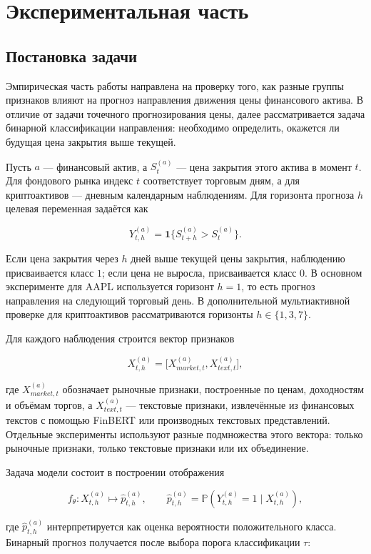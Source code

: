 \section{Экспериментальная часть}

\subsection{Постановка задачи}

Эмпирическая часть работы направлена на проверку того, как разные группы признаков влияют на прогноз направления движения цены финансового актива. В отличие от задачи точечного прогнозирования цены, далее рассматривается задача бинарной классификации направления: необходимо определить, окажется ли будущая цена закрытия выше текущей.

Пусть $a$ --- финансовый актив, а $S_t^{(a)}$ --- цена закрытия этого актива в момент $t$. Для фондового рынка индекс $t$ соответствует торговым дням, а для криптоактивов --- дневным календарным наблюдениям. Для горизонта прогноза $h$ целевая переменная задаётся как

\[
Y_{t,h}^{(a)} = \mathbf{1}\{S_{t+h}^{(a)} > S_t^{(a)}\}.
\]

Если цена закрытия через $h$ дней выше текущей цены закрытия, наблюдению присваивается класс $1$; если цена не выросла, присваивается класс $0$. В основном эксперименте для AAPL используется горизонт $h=1$, то есть прогноз направления на следующий торговый день. В дополнительной мультиактивной проверке для криптоактивов рассматриваются горизонты $h \in \{1,3,7\}$.

Для каждого наблюдения строится вектор признаков

\[
X_{t,h}^{(a)} = \bigl[X_{market,t}^{(a)}, X_{text,t}^{(a)}\bigr],
\]

где $X_{market,t}^{(a)}$ обозначает рыночные признаки, построенные по ценам, доходностям и объёмам торгов, а $X_{text,t}^{(a)}$ --- текстовые признаки, извлечённые из финансовых текстов с помощью FinBERT или производных текстовых представлений. Отдельные эксперименты используют разные подмножества этого вектора: только рыночные признаки, только текстовые признаки или их объединение.

Задача модели состоит в построении отображения

\[
f_\theta: X_{t,h}^{(a)} \mapsto \widehat{p}_{t,h}^{(a)},
\qquad
\widehat{p}_{t,h}^{(a)} = \mathbb{P}\left(Y_{t,h}^{(a)}=1 \mid X_{t,h}^{(a)}\right),
\]

где $\widehat{p}_{t,h}^{(a)}$ интерпретируется как оценка вероятности положительного класса. Бинарный прогноз получается после выбора порога классификации $\tau$:

